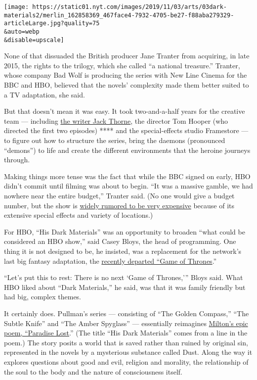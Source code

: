\texttt{[image: https://static01.nyt.com/images/2019/11/03/arts/03dark-materials2/merlin\_162858369\_467face4-7932-4705-be27-f88aba279329-articleLarge.jpg?quality=75\\\&auto=webp\\\&disable=upscale]}

None of that dissuaded the British producer Jane Tranter from acquiring,
in late 2015, the rights to the trilogy, which she called ``a national
treasure.'' Tranter, whose company Bad Wolf is producing the series with
New Line Cinema for the BBC and HBO, believed that the novels'
complexity made them better suited to a TV adaptation, she said.

But that doesn't mean it was easy. It took two-and-a-half years for the
creative team --- including
\href{https://www.nytimes.com/2019/09/04/theater/jack-thorne-his-dark-materials.html?searchResultPosition=1}{the
writer Jack Thorne}, the director Tom Hooper (who directed the first two
episodes) **** and the special-effects studio Framestore --- to figure
out how to structure the series, bring the daemons (pronounced
``demons'') to life and create the different environments that the
heroine journeys through.

Making things more tense was the fact that while the BBC signed on
early, HBO didn't commit until filming was about to begin. ``It was a
massive gamble, we had nowhere near the entire budget,'' Tranter said.
(No one would give a budget number, but the show is
\href{https://www.telegraph.co.uk/news/2019/07/20/bbc-takes-gamble-philip-pullmans-dark-materials-expensive-british/}{widely
rumored to be very expensive} because of its extensive special effects
and variety of locations.)

For HBO, ``His Dark Materials'' was an opportunity to broaden ``what
could be considered an HBO show,'' said Casey Bloys, the head of
programming. One thing it is not designed to be, he insisted, was a
replacement for the network's last big fantasy adaptation, the
\href{https://www.nytimes.com/interactive/2019/arts/game-of-thrones.html?module=inline}{recently
departed ``Game of Thrones}.''

``Let's put this to rest: There is no next `Game of Thrones,''' Bloys
said. What HBO liked about ``Dark Materials,'' he said, was that it was
family friendly but had big, complex themes.

It certainly does. Pullman's series --- consisting of ``The Golden
Compass,'' ``The Subtle Knife'' and ``The Amber Spyglass'' ---
essentially reimagines
\href{http://www.bbc.com/culture/story/20170419-why-paradise-lost-is-one-of-the-worlds-most-important-poems}{Milton's
epic poem, ``Paradise Lost}.'' (The title ``His Dark Materials'' comes
from a line in the poem.) The story posits a world that is saved rather
than ruined by original sin, represented in the novels by a mysterious
substance called Dust. Along the way it explores questions about good
and evil, religion and morality, the relationship of the soul to the
body and the nature of consciousness itself.

